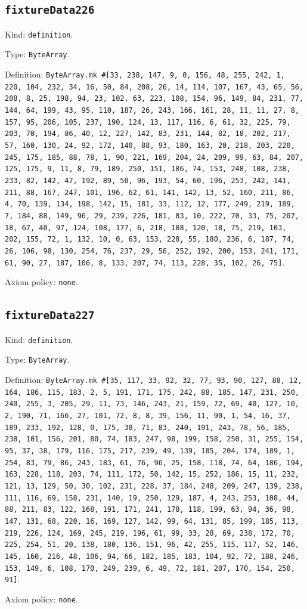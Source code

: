 \documentclass[11pt]{article}
\begin{document}
\subsection*{\texttt{fixtureData226}}
\noindent Kind: \texttt{definition}.\par
\noindent Type: \texttt{ByteArray}.\par
\noindent Definition: \texttt{ByteArray.mk \#[33, 238, 147, 9, 0, 156, 48, 255, 242, 1, 220, 104, 232, 34, 16, 50, 84, 208, 26, 14, 114, 107, 167, 43, 65, 56, 208, 8, 25, 198, 94, 23, 102, 63, 223, 108, 154, 96, 149, 84, 231, 77, 144, 64, 199, 43, 95, 110, 187, 26, 243, 166, 161, 28, 11, 11, 27, 8, 157, 95, 206, 105, 237, 190, 124, 13, 117, 116, 6, 61, 32, 225, 79, 203, 70, 194, 86, 40, 12, 227, 142, 83, 231, 144, 82, 18, 202, 217, 57, 160, 130, 24, 92, 172, 140, 88, 93, 180, 163, 20, 218, 203, 220, 245, 175, 185, 88, 78, 1, 90, 221, 169, 204, 24, 209, 99, 63, 84, 207, 125, 175, 9, 11, 8, 79, 189, 250, 151, 186, 74, 153, 248, 108, 238, 233, 82, 142, 47, 192, 89, 50, 96, 193, 54, 60, 196, 253, 242, 141, 211, 88, 167, 247, 101, 196, 62, 61, 141, 142, 13, 52, 160, 211, 86, 4, 70, 139, 134, 198, 142, 15, 181, 33, 112, 12, 177, 249, 219, 189, 7, 184, 88, 149, 96, 29, 239, 226, 181, 83, 10, 222, 70, 33, 75, 207, 18, 67, 40, 97, 124, 108, 177, 6, 218, 188, 120, 18, 75, 219, 103, 202, 155, 72, 1, 132, 10, 0, 63, 153, 228, 55, 180, 236, 6, 187, 74, 26, 106, 98, 130, 254, 76, 237, 29, 56, 252, 192, 200, 153, 241, 171, 61, 90, 27, 187, 106, 8, 133, 207, 74, 113, 228, 35, 102, 26, 75]}.\par
\noindent Axiom policy: \texttt{none}.\par
\subsection*{\texttt{fixtureData227}}
\noindent Kind: \texttt{definition}.\par
\noindent Type: \texttt{ByteArray}.\par
\noindent Definition: \texttt{ByteArray.mk \#[35, 117, 33, 92, 32, 77, 93, 90, 127, 88, 12, 164, 186, 115, 183, 2, 5, 191, 171, 175, 242, 88, 185, 147, 231, 250, 240, 255, 3, 205, 29, 11, 73, 146, 243, 21, 159, 72, 69, 40, 127, 10, 2, 190, 71, 166, 27, 101, 72, 8, 8, 39, 156, 11, 90, 1, 54, 16, 37, 189, 233, 192, 128, 0, 175, 38, 71, 83, 240, 191, 243, 78, 56, 185, 238, 101, 156, 201, 80, 74, 183, 247, 98, 199, 158, 250, 31, 255, 154, 95, 37, 38, 179, 116, 175, 217, 239, 49, 139, 185, 204, 174, 189, 1, 254, 83, 79, 86, 243, 183, 61, 76, 96, 25, 158, 118, 74, 64, 186, 194, 163, 228, 118, 203, 74, 111, 172, 50, 142, 15, 252, 186, 15, 11, 232, 121, 13, 129, 50, 30, 102, 231, 228, 37, 184, 248, 209, 247, 139, 238, 111, 116, 69, 158, 231, 140, 19, 250, 129, 187, 4, 243, 253, 108, 44, 88, 211, 83, 122, 168, 191, 171, 241, 178, 118, 199, 63, 94, 36, 98, 147, 131, 68, 220, 16, 169, 127, 142, 99, 64, 131, 85, 199, 185, 113, 219, 226, 124, 169, 245, 219, 196, 61, 99, 33, 28, 69, 238, 172, 70, 225, 254, 51, 20, 138, 180, 136, 151, 96, 42, 255, 115, 117, 52, 146, 145, 160, 216, 48, 106, 94, 66, 182, 185, 183, 104, 92, 72, 188, 246, 153, 149, 6, 108, 170, 249, 239, 6, 49, 72, 181, 207, 170, 154, 250, 91]}.\par
\noindent Axiom policy: \texttt{none}.\par
\end{document}
